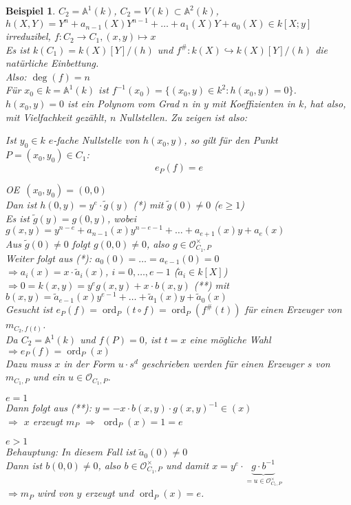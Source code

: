 \documentclass[a4paper,12pt]{report}
\theoremstyle{break}
\theoremstyle{nonumberbreak}
\newtheorem{nnBsp}{Beispiel}
\theoremstyle{nonumberplain}
\DeclareMathOperator{\ord}{ord}
\newcommand{\A}{\mathbb{A}}
\newcommand{\calO}{\mathcal{O}}
\newcommand{\X}{\times}
\renewcommand{\OE}{O\!\!E~}
\begin{document}
\begin{nnBsp}
$C_2=\A^1(k)$, $C_2=V(k)\subset \A^2(k)$, $h(X,Y)=Y^n+a_{n-1}(X)Y^{n-1}+\ldots +a_1(X)Y+a_0(X) \in k[X;y]$ irreduzibel, $f:C_2 \to C_1, (x,y) \mapsto x$\\
Es ist $k(C_1) = k(X)[Y]/(h)$ und $f^\#: k(X) \hookrightarrow k(X)[Y]/(h)$ die nat\"urliche Einbettung.\\
Also: $\deg(f) = n$\\
F\"ur $x_0 \in k =\A^1(k)$ ist $f^{-1}(x_0) = \{ (x_0,y) \in k^2: h(x_0,y)=0\}$.\\
$h(x_0,y)=0$ ist ein Polynom vom Grad $n$ in $y$ mit Koeffizienten in $k$, hat also, mit Vielfachkeit gez\"ahlt, $n$ Nullstellen. Zu zeigen ist also:
\begin{description}[\setlabelstyle{\itshape}]
\item[Behauptung:]
	Ist $y_0 \in k$ $e$-fache Nullstelle von $h(x_0,y)$, so gilt f\"ur den Punkt $P = (x_0,y_0) \in C_1$: \[e_P(f)=e\]
\item[Beweis:]
	\OE $(x_0, y_0) = (0,0)$\\
	Dan ist $h(0,y) = y^e\cdot \tilde{g}(y)$ (*) mit $\tilde{g}(0) \ne 0$ ($e \ge 1$)\\
	Es ist $\tilde{g}(y) = g(0,y)$, wobei $g(x,y) = y^{n-e} + a_{n-1}(x)y^{n-e-1} + \ldots + a_{e+1}(x)y + a_e(x)$\\
	Aus $\tilde{g}(0) \ne 0$ folgt $g(0,0) \ne 0$, also $g \in \calO_{C_1, P}^\X$\\
	Weiter folgt aus (*): $a_0(0) = \ldots = a_{e-1}(0) = 0$\\
	$\Rightarrow a_i(x) = x \cdot \tilde{a}_i(x)$, $i=0,\ldots ,e-1$ ($\tilde{a}_i \in k[X]$)\\
	$\Rightarrow 0=k(x,y) = y^e g(x,y) + x \cdot b(x,y)$ (**) mit $b(x,y) = \tilde{a}_{e-1}(x)y^{e-1} + \ldots  + \tilde{a}_1(x)y + \tilde{a}_0(x)$\\
	Gesucht ist $e_P(f) = \ord_P(t \circ f) = \ord_P(f^\#(t))$ f\"ur einen Erzeuger von $m_{C_2,f(t)}$.\\
	Da $C_2 = \A^1(k)$ und $f(P) = 0$, ist $t=x$ eine m\"ogliche Wahl $\Rightarrow e_P(f) = \ord_P(x)$\\
	Dazu muss $x$ in der Form $u\cdot s^d$ geschrieben werden f\"ur einen Erzeuger $s$ von $m_{C_1,P}$ und ein $u \in \calO_{C_1,P}$.
	\begin{description}[\setlabelstyle{\itshape}]
		\item[1. Fall:] $e=1$\\
			Dann folgt aus (**):	$y = -x \cdot b(x,y) \cdot g(x,y)^{-1} \in (x)$\\
			$\Rightarrow$ $x$ erzeugt $m_P$ $\Rightarrow$ $\ord_P(x) = 1 = e$
		\item[2. Fall:] $e > 1$\\
			\emph{Behauptung:} In diesem Fall ist $\tilde{a}_0(0) \ne 0$\\
			Dann ist $b(0,0) \ne 0$, also $b \in \calO_{C_1,P}^\X$ und damit $x= y^e \cdot \underbrace{g \cdot b^{-1}}_{=u \in \calO_{C_1,P}^\X}$\\
			$\Rightarrow m_P$ wird von $y$ erzeugt und $\ord_P(x) = e$.
	\end{description}
\end{description}\end{nnBsp}
\end{document}
